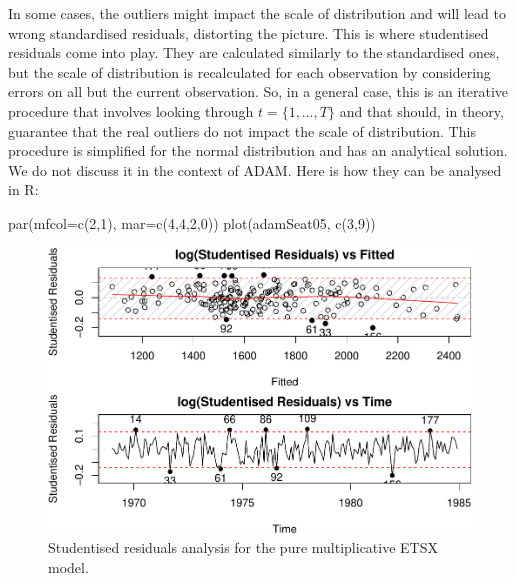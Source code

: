 \documentclass[
]{book}
\newenvironment{Shaded}{\begin{snugshade}}{\end{snugshade}}
\newcommand{\AttributeTok}[1]{\textcolor[rgb]{0.77,0.63,0.00}{#1}}
\newcommand{\DecValTok}[1]{\textcolor[rgb]{0.00,0.00,0.81}{#1}}
\newcommand{\FunctionTok}[1]{\textcolor[rgb]{0.00,0.00,0.00}{#1}}
\newcommand{\NormalTok}[1]{#1}
\theoremstyle{definition}
\theoremstyle{definition}
\theoremstyle{definition}
\theoremstyle{definition}
\theoremstyle{remark}
\begin{document}
In some cases, the outliers might impact the scale of distribution and will lead to wrong standardised residuals, distorting the picture. This is where studentised residuals come into play. They are calculated similarly to the standardised ones, but the scale of distribution is recalculated for each observation by considering errors on all but the current observation. So, in a general case, this is an iterative procedure that involves looking through \(t=\{1,\dots,T\}\) and that should, in theory, guarantee that the real outliers do not impact the scale of distribution. This procedure is simplified for the normal distribution and has an analytical solution. We do not discuss it in the context of ADAM. Here is how they can be analysed in R:

\begin{Shaded}
\begin{Highlighting}[]
\FunctionTok{par}\NormalTok{(}\AttributeTok{mfcol=}\FunctionTok{c}\NormalTok{(}\DecValTok{2}\NormalTok{,}\DecValTok{1}\NormalTok{), }\AttributeTok{mar=}\FunctionTok{c}\NormalTok{(}\DecValTok{4}\NormalTok{,}\DecValTok{4}\NormalTok{,}\DecValTok{2}\NormalTok{,}\DecValTok{0}\NormalTok{))}
\FunctionTok{plot}\NormalTok{(adamSeat05, }\FunctionTok{c}\NormalTok{(}\DecValTok{3}\NormalTok{,}\DecValTok{9}\NormalTok{))}
\end{Highlighting}
\end{Shaded}

\begin{figure}
\centering
\includegraphics{Svetunkov--2022----ADAM_files/figure-latex/adamSeat05Student-1.pdf}
\caption{\label{fig:adamSeat05Student}Studentised residuals analysis for the pure multiplicative ETSX model.}
\end{figure}
\end{document}
